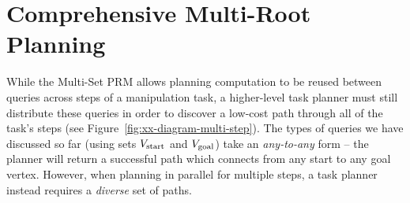 \clearpage
\section{Comprehensive Multi-Root Planning}
\label{chap:cmr}

While the Multi-Set PRM
allows planning computation to be reused between queries
across steps of a manipulation task,
a higher-level task planner must still distribute these queries
in order to discover a low-cost path
through all of the task's steps
(see Figure~\ref{fig:xx-diagram-multi-step}).
The types of queries we have discussed so far
(using sets
$V_{\mbox{\scriptsize start}}$ and $V_{\mbox{\scriptsize goal}}$)
take an \emph{any-to-any} form
-- the planner will return a successful path which connects
from any start to any goal vertex.
However,
when planning in parallel for multiple steps,
a task planner instead requires a \emph{diverse} set of
paths.

